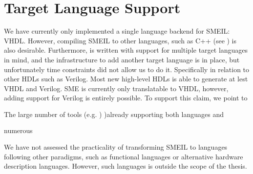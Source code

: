 \section{Target Language Support}
We have currently only implemented a single language backend for SMEIL:
VHDL. However, compiling SMEIL to other languages, such as C++ (see
\cite{skovhede2017c++}) is also desirable. Furthermore, \libsme is written with
support for multiple target languages in mind, and the infrastructure to add
another target language is in place, but unfortunately time constraints did not
allow us to do it. Specifically in relation to other HDLs such as Verilog. Most
new high-level HDLs is able to generate at lest VHDL and Verilog. SME is
currently only translatable to VHDL, however, adding support for Verilog is
entirely possible. To support this claim, we point
to \begin{inparaenum}[a)]\item The large number of tools (e.g. )
  )already supporting both languages and \item numerous \end{inparaenum}   We have not assessed the
  practicality of transforming SMEIL to languages following other paradigms,
  such as functional languages or alternative hardware description
  languages. However, such languages is outside the scope of the thesis.

